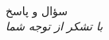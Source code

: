 \begin{frame}[c]{\,}
  \centering
  \begin{minipage}{\textwidth}
    \centering
    \Huge سؤال و پاسخ \\[1cm]
    \Large \textsl{با تشکر از توجه شما}
  \end{minipage}
\end{frame}

